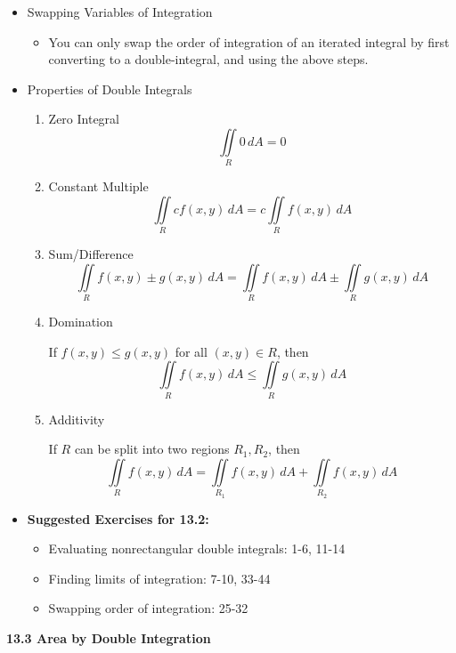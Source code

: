 \documentclass[12pt]{article}
\newcommand{\<}{\left<}
\renewcommand{\>}{\right>}
\begin{document}
\begin{itemize}
  \item Swapping Variables of Integration
  
    \begin{itemize}
    \item You can only swap the order of integration of an iterated integral by first converting to a double-integral, and using the above steps.
    \end{itemize}

  \item Properties of Double Integrals
      \begin{enumerate}
      \item Zero Integral
        \[\iint\limits_R 0\,dA = 0\]
      \item Constant Multiple
        \[\iint\limits_R cf(x,y)\,dA = c\iint\limits_R f(x,y)\,dA\]
      \item Sum/Difference
        \[\iint\limits_R f(x,y)\pm g(x,y)\,dA=\iint\limits_R f(x,y)\,dA\pm\iint\limits_R g(x,y)\,dA\]
      \item Domination
      
      If $f(x,y)\leq g(x,y)$ for all $(x,y)\in R$, then
        \[\iint\limits_R f(x,y)\,dA \leq \iint\limits_R g(x,y)\,dA\]
      \item Additivity
      
      If $R$ can be split into two regions $R_1,R_2$, then
        \[\iint\limits_R f(x,y)\,dA = \iint\limits_{R_1} f(x,y)\,dA + \iint\limits_{R_2} f(x,y)\,dA\]
      \end{enumerate}
    
  \item \textbf{Suggested Exercises for 13.2:}
  
    \begin{itemize}
    \item Evaluating nonrectangular double integrals: 1-6, 11-14
    \item Finding limits of integration: 7-10, 33-44
    \item Swapping order of integration: 25-32
    \end{itemize}
    
  \end{itemize}
  
  \newpage
  
  \centerline{\bf 13.3 Area by Double Integration}
  
\end{document}

